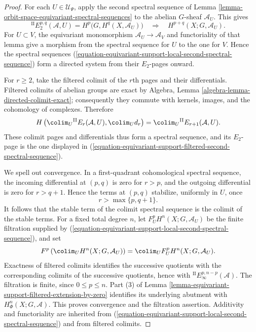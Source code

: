 \begin{proof}
For each $U\in\mathcal U_\Psi$, apply the second spectral sequence of
Lemma \ref{lemma-orbit-space-equivariant-spectral-sequences} to the
abelian $G$-sheaf $\mathcal A_U$. This gives
\begin{equation}
\label{equation-equivariant-support-local-second-spectral-sequence}
{}^{\mathrm {II}}E_2^{p,q}(\mathcal A,U)
=H^p\bigl(G,H^q(X,\mathcal A_U)\bigr)
\quad\Longrightarrow\quad
H^{p+q}(X;G,\mathcal A_U).
\end{equation}
For $U\subset V$, the equivariant monomorphism
$\mathcal A_U\to\mathcal A_V$ and functoriality of that lemma give a
morphism from the spectral sequence for $U$ to the one for $V$. Hence the
spectral sequences
(\ref{equation-equivariant-support-local-second-spectral-sequence}) form a
directed system from their $E_2$-pages onward.

For $r\geq 2$, take the filtered colimit of the $r$th pages and their
differentials. Filtered colimits of abelian groups are exact by Algebra,
Lemma \ref{algebra-lemma-directed-colimit-exact}; consequently they commute
with kernels, images, and the cohomology of complexes. Therefore
$$
H\left(\colim_U{}^{\mathrm {II}}E_r(\mathcal A,U),
\colim_U d_r\right)
=
\colim_U{}^{\mathrm {II}}E_{r+1}(\mathcal A,U).
$$
These colimit pages and differentials thus form a spectral sequence, and
its $E_2$-page is the one displayed in
(\ref{equation-equivariant-support-filtered-second-spectral-sequence}).

We spell out convergence. In a first-quadrant cohomological spectral
sequence, the incoming differential at $(p,q)$ is zero for $r>p$, and the
outgoing differential is zero for $r>q+1$. Hence the terms at $(p,q)$
stabilize, uniformly in $U$, once
$$
r>\max\{p,q+1\}.
$$
It follows that the stable term of the colimit spectral sequence is the
colimit of the stable terms. For a fixed total degree $n$, let
$F_U^pH^n(X;G,\mathcal A_U)$ be the finite filtration supplied by
(\ref{equation-equivariant-support-local-second-spectral-sequence}),
and set
$$
F^p\left(\colim_UH^n(X;G,\mathcal A_U)\right)
=
\colim_UF_U^pH^n(X;G,\mathcal A_U).
$$
Exactness of filtered colimits identifies the successive quotients with
the corresponding colimits of the successive quotients, hence with
${}^{\mathrm {II}}E_\infty^{p,n-p}(\mathcal A)$. The filtration is finite,
since $0\leq p\leq n$. Part (3) of Lemma
\ref{lemma-equivariant-support-filtered-extension-by-zero} identifies its
underlying abutment with $H^n_\Phi(X;G,\mathcal A)$. This proves convergence
and the filtration assertion. Additivity and functoriality are inherited
from
(\ref{equation-equivariant-support-local-second-spectral-sequence}) and
from filtered colimits.


\end{proof}
